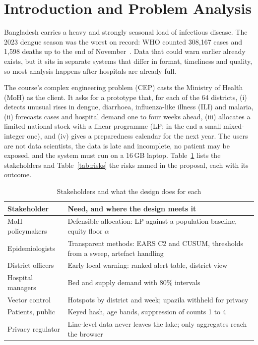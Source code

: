 \section{Introduction and Problem Analysis}
Bangladesh carries a heavy and strongly seasonal load of infectious disease. The 2023 dengue season was the
worst on record: WHO counted 308,167 cases and 1,598 deaths up to the end of November~\cite{who2023don498}.
Data that could warn earlier already exists, but it sits in separate systems that differ in format,
timeliness and quality, so most analysis happens after hospitals are already full.

The course's complex engineering problem (CEP) casts the Ministry of Health (MoH) as the client. It asks for a prototype that, for each of the 64 districts, (i) detects
unusual rises in dengue, diarrhoea, influenza-like illness (ILI) and malaria, (ii) forecasts cases and hospital
demand one to four weeks ahead, (iii) allocates a limited national stock with a linear programme (LP; in the end a small mixed-integer one), and (iv) gives a preparedness
calendar for the next year. The users are not data scientists, the data is late and incomplete, no patient may
be exposed, and the system must run on a 16\,GB laptop. Table~\ref{tab:stakeholders} lists the stakeholders and
Table~\ref{tab:risks} the risks named in the proposal, each with its outcome.

\begin{table}[htbp]
\caption{Stakeholders and what the design does for each}
\label{tab:stakeholders}
\centering\footnotesize
\begin{tabular}{@{}>{\raggedright\arraybackslash}p{2.1cm}>{\raggedright\arraybackslash}p{5.6cm}@{}}
\toprule
Stakeholder & Need, and where the design meets it \\
\midrule
MoH policymakers & Defensible allocation: LP against a population baseline, equity floor $\alpha$ \\
Epidemiologists & Transparent methods: EARS C2 and CUSUM, thresholds from a sweep, artefact handling \\
District officers & Early local warning: ranked alert table, district view \\
Hospital managers & Bed and supply demand with 80\% intervals \\
Vector control & Hotspots by district and week; upazila withheld for privacy \\
Patients, public & Keyed hash, age bands, suppression of counts 1 to 4 \\
Privacy regulator & Line-level data never leaves the lake; only aggregates reach the browser \\
\bottomrule
\end{tabular}
\end{table}

